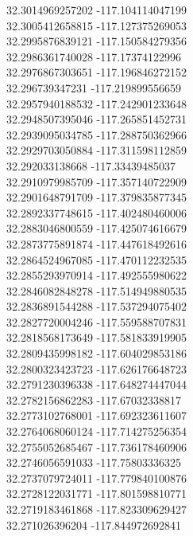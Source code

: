 {32.3014969257202	-117.104114047199\\
32.3005412658815	-117.127375269053\\
32.2995876839121	-117.150584279356\\
32.2986361740028	-117.17374122996\\
32.2976867303651	-117.196846272152\\
32.296739347231	-117.219899556659\\
32.2957940188532	-117.242901233648\\
32.2948507395046	-117.265851452731\\
32.2939095034785	-117.288750362966\\
32.2929703050884	-117.311598112859\\
32.292033138668	-117.33439485037\\
32.2910979985709	-117.357140722909\\
32.2901648791709	-117.379835877345\\
32.2892337748615	-117.402480460006\\
32.2883046800559	-117.425074616679\\
32.2873775891874	-117.447618492616\\
32.2864524967085	-117.470112232535\\
32.2855293970914	-117.492555980622\\
32.2846082848278	-117.514949880535\\
32.2836891544288	-117.537294075402\\
32.2827720004246	-117.559588707831\\
32.2818568173649	-117.581833919905\\
32.2809435998182	-117.604029853186\\
32.2800323423723	-117.626176648723\\
32.2791230396338	-117.648274447044\\
32.2782156862283	-117.67032338817\\
32.2773102768001	-117.692323611607\\
32.2764068060124	-117.714275256354\\
32.2755052685467	-117.736178460906\\
32.2746056591033	-117.75803336325\\
32.2737079724011	-117.779840100876\\
32.2728122031771	-117.801598810771\\
32.2719183461868	-117.823309629427\\
32.271026396204	-117.844972692841\\
}
